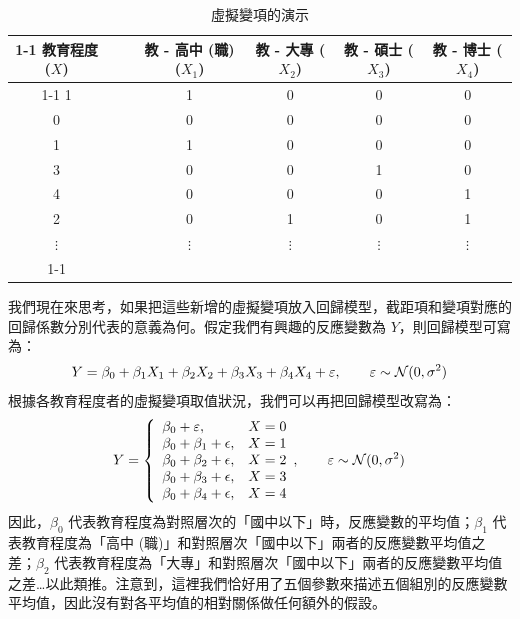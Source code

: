     \begin{table}[htbp]
        \begin{center}
            \begin{tabular}{ccccccc}
                \cline{1-1} \cline{4-7}
                教育程度($X$) &&& 教 - 高中 (職) ($X_1$) & 教 - 大專 ($X_2$) & 教 - 碩士 ($X_3$) & 教 - 博士 ($X_4$)\\
                \cline{1-1} \cline{4-7}
                1 &&& 1 & 0 & 0 & 0\\
                0 &&& 0 & 0 & 0 & 0\\
                1 &&& 1 & 0 & 0 & 0\\
                3 &&& 0 & 0 & 1 & 0\\
                4 &&& 0 & 0 & 0 & 1\\
                2 &&& 0 & 1 & 0 & 1\\
                $\vdots$ &&& $\vdots$ & $\vdots$ & $\vdots$ & $\vdots$ \\
                \cline{1-1} \cline{4-7}
            \end{tabular}
            \caption{虛擬變項的演示\label{tab:dummy_variable}}
        \end{center}
    \end{table}

    我們現在來思考，如果把這些新增的虛擬變項放入回歸模型，截距項和變項對應的回歸係數分別代表的意義為何。假定我們有興趣的反應變數為 $Y$，則回歸模型可寫為：
    \smallskip
    \[Y = \beta_0 + \beta_1 X_1 + \beta_2 X_2 + \beta_3 X_3 + \beta_4 X_4 + \varepsilon, \qquad \varepsilon \sim \mathcal{N}(0, \sigma^2)\]
    \smallskip
    根據各教育程度者的虛擬變項取值狀況，我們可以再把回歸模型改寫為：
    \smallskip
    \[Y = \left\{\begin{array}{lr}
        \beta_0 + \varepsilon, & X = 0\\
        \beta_0 + \beta_1 + \epsilon, & X = 1\\
        \beta_0 + \beta_2 + \epsilon, & X = 2\\
        \beta_0 + \beta_3 + \epsilon, & X = 3\\
        \beta_0 + \beta_4 + \epsilon, & X = 4
    \end{array}, \qquad \varepsilon \sim \mathcal{N}(0, \sigma^2) \right.\]
    \smallskip
    因此，$\beta_0$ 代表教育程度為對照層次的「國中以下」時，反應變數的平均值；$\beta_1$ 代表教育程度為「高中 (職)」和對照層次「國中以下」兩者的反應變數平均值之差；$\beta_2$ 代表教育程度為「大專」和對照層次「國中以下」兩者的反應變數平均值之差…以此類推。注意到，這裡我們恰好用了五個參數來描述五個組別的反應變數平均值，因此沒有對各平均值的相對關係做任何額外的假設。

